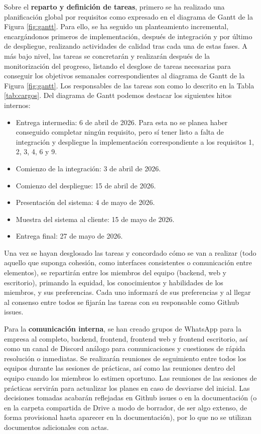 \documentclass[11pt]{article}
\begin{document}
Sobre el \textbf{reparto y definición de tareas}, primero se ha realizado una
planificación global por requisitos como expresado en el diagrama de Gantt de
la Figura \ref{fig:gantt}. Para ello, se ha seguido un planteamiento
incremental, encargándonos primeros de implementación, después de integración
y por último de despliegue, realizando actividades de calidad tras cada una de
estas fases.
A más bajo nivel, las tareas se concretarán y 
realizarán después de la monitorización del progreso, listando el desglose de
tareas necesarias para conseguir los objetivos semanales correspondientes al
diagrama de Gantt de la Figura \ref{fig:gantt}. Los responsables de las tareas
son como lo descrito en la Tabla \ref{tab:cargos}. Del diagrama de Gantt podemos
destacar los siguientes hitos internos:
\begin{itemize}
		\item Entrega intermedia: 6 de abril de 2026. Para esta no se planea haber
				conseguido completar ningún requisito, pero sí tener listo a falta de
				integración y despliegue la implementación correspondiente a los
				requisitos 1, 2, 3, 4, 6 y 9.
		\item Comienzo de la integración: 3 de abril de 2026.
		\item Comienzo del despliegue: 15 de abril de 2026.
		\item Presentación del sistema: 4 de mayo de 2026.
		\item Muestra del sistema al cliente: 15 de mayo de 2026.
		\item Entrega final: 27 de mayo de 2026.
\end{itemize}

Una vez se hayan desglosado las tareas y concordado
cómo se van a realizar (todo aquello que suponga cohesión, como interfaces
consistentes o comunicación entre elementos), se repartirán entre los miembros
del equipo (backend, web y escritorio), primando la equidad, los conocimientos y habilidades de
los miembros, y sus preferencias. Cada uno informará de sus preferencias y al
llegar al consenso entre todos se fijarán las tareas con su responsable como
Github issues.

Para la \textbf{comunicación interna}, se han creado grupos de WhatsApp para la
empresa al completo, backend, frontend, frontend web y frontend escritorio,
así como un canal de Discord análogo para comunicaciones y
cuestiones de rápida resolución o inmediatas. Se realizarán reuniones de 
seguimiento entre todos los equipos durante las sesiones de prácticas, así
como las reuniones dentro del equipo cuando los miembros lo estimen
oportuno. Las reuniones de las sesiones de prácticas servirán para
actualizar los planes en caso de desviarse del inicial. 
Las decisiones tomadas acabarán reflejadas en Github issues o en la 
documentación (o en la carpeta compartida de Drive a modo de borrador, 
de ser algo extenso, de forma provisional hasta aparecer en la documentación), 
por lo que no se utilizan documentos adicionales con actas.
\end{document}
